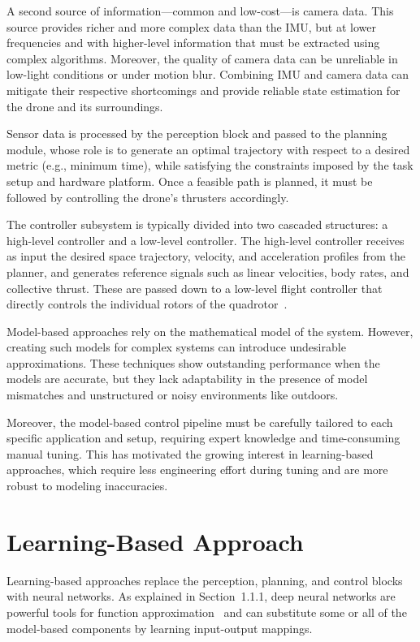 \documentclass[a4paper,oneside]{book}
\theoremstyle{definition}
\begin{document}
A second source of information—common and low-cost—is camera data. This source provides richer and more complex data than the IMU, but at lower frequencies and with higher-level information that must be extracted using complex algorithms. Moreover, the quality of camera data can be unreliable in low-light conditions or under motion blur. Combining IMU and camera data can mitigate their respective shortcomings and provide reliable state estimation for the drone and its surroundings.

Sensor data is processed by the perception block and passed to the planning module, whose role is to generate an optimal trajectory with respect to a desired metric (e.g., minimum time), while satisfying the constraints imposed by the task setup and hardware platform. Once a feasible path is planned, it must be followed by controlling the drone’s thrusters accordingly.

The controller subsystem is typically divided into two cascaded structures: a high-level controller and a low-level controller. The high-level controller receives as input the desired space trajectory, velocity, and acceleration profiles from the planner, and generates reference signals such as linear velocities, body rates, and collective thrust. These are passed down to a low-level flight controller that directly controls the individual rotors of the quadrotor~\cite{reference26}.

Model-based approaches rely on the mathematical model of the system. However, creating such models for complex systems can introduce undesirable approximations. These techniques show outstanding performance when the models are accurate, but they lack adaptability in the presence of model mismatches and unstructured or noisy environments like outdoors.

Moreover, the model-based control pipeline must be carefully tailored to each specific application and setup, requiring expert knowledge and time-consuming manual tuning. This has motivated the growing interest in learning-based approaches, which require less engineering effort during tuning and are more robust to modeling inaccuracies.

\section*{Learning-Based Approach}

Learning-based approaches replace the perception, planning, and control blocks with neural networks. As explained in Section~1.1.1, deep neural networks are powerful tools for function approximation~\cite{reference27} and can substitute some or all of the model-based components by learning input-output mappings.
\end{document}
